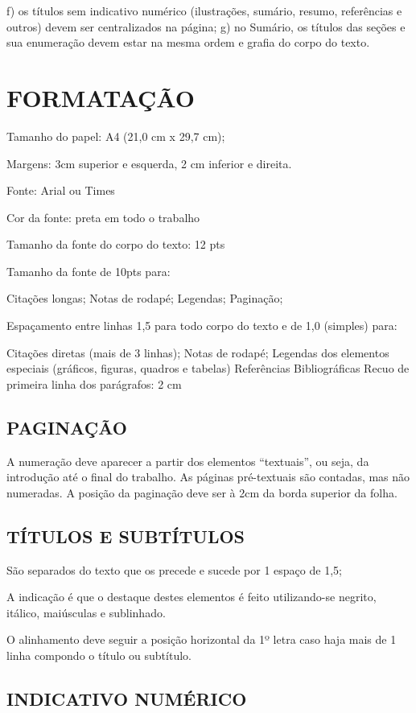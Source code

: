 f) os títulos sem indicativo numérico (ilustrações, sumário, resumo, referências e outros)
devem ser centralizados na página;
g) no Sumário, os títulos das seções e sua enumeração devem estar na mesma ordem e
grafia do corpo do texto. 

\section{FORMATAÇÃO}

Tamanho do papel: A4 (21,0 cm x 29,7 cm);

Margens: 3cm superior e esquerda, 2 cm inferior e direita.

Fonte: Arial ou Times 

Cor da fonte: preta em todo o trabalho

Tamanho da fonte do corpo do texto: 12 pts

Tamanho da fonte de 10pts para:


Citações longas;
Notas de rodapé;
Legendas;
Paginação;

Espaçamento entre linhas 1,5 para todo corpo do texto e de 1,0 (simples) para:


Citações diretas (mais de 3 linhas);
Notas de rodapé;
Legendas dos elementos especiais (gráficos, figuras, quadros e tabelas)
Referências Bibliográficas
Recuo de primeira linha dos parágrafos: 2 cm

\subsection{PAGINAÇÃO}

A numeração deve aparecer a partir dos elementos “textuais”, ou seja, da introdução até o final do trabalho.
As páginas pré-textuais são contadas, mas não numeradas.
A posição da paginação deve ser à 2cm da borda superior da folha.

\subsection{TÍTULOS E SUBTÍTULOS}

São separados do texto que os precede e sucede por 1 espaço de 1,5; 

A indicação é que o destaque destes elementos é feito utilizando-se negrito, itálico, maiúsculas e sublinhado. 

O alinhamento deve seguir a posição horizontal da 1º letra caso haja mais de 1 linha compondo o título ou subtítulo.

\subsection{INDICATIVO NUMÉRICO}

